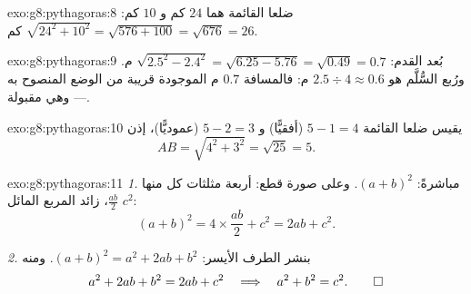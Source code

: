 \begin{solution}{exo:g8:pythagoras:8}
ضلعا القائمة هما $24$ كم و $10$ كم:
$\sqrt{24^2 + 10^2} = \sqrt{576 + 100} = \sqrt{676} = 26$ كم.
\end{solution}

\begin{solution}{exo:g8:pythagoras:9}
بُعد القدم: $\sqrt{2.5^2 - 2.4^2} = \sqrt{6.25 - 5.76} =
\sqrt{0.49} = 0.7$ م. ورُبع السُّلَّم هو
$2.5 \div 4 \approx 0.6$ م: فالمسافة $0.7$ م الموجودة قريبة من الوضع
المنصوح به --- وهي مقبولة.
\end{solution}

\begin{solution}{exo:g8:pythagoras:10}
يقيس ضلعا القائمة $5 - 1 = 4$ (أفقيًّا) و $5 - 2 = 3$
(عموديًّا)، إذن
\[
AB = \sqrt{4^2 + 3^2} = \sqrt{25} = 5 .
\]
\end{solution}

\begin{solution}{exo:g8:pythagoras:11}
\emph{1.} مباشرةً: $(a + b)^2$. وعلى صورة قطع: أربعة مثلثات  كل منها
$\frac{ab}{2}$، زائد المربع المائل $c^2$:
\[
(a + b)^2 = 4 \times \frac{ab}{2} + c^2 = 2ab + c^2 .
\]

\emph{2.} بنشر الطرف الأيسر:
$(a+b)^2 = a^2 + 2ab + b^2$. ومنه
\[
a^2 + 2ab + b^2 = 2ab + c^2
\quad\Longrightarrow\quad
a^2 + b^2 = c^2 . \qed
\]
\end{solution}

